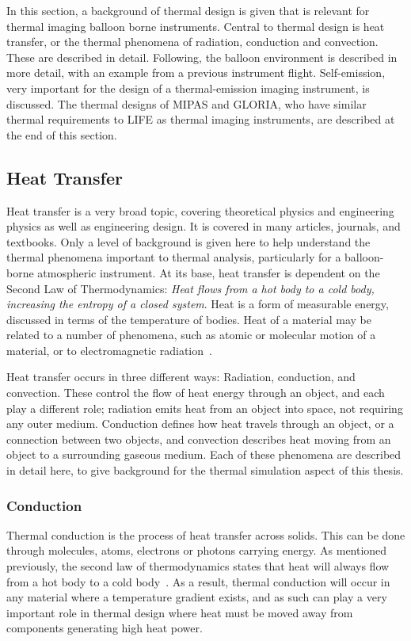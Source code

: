 In this section, a background of thermal design is given that is relevant for thermal imaging balloon borne instruments. Central to thermal design is heat transfer, or the thermal phenomena of radiation, conduction and convection. These are described in detail. Following, the balloon environment is described in more detail, with an example from a previous instrument flight. Self-emission, very important for the design of a thermal-emission imaging instrument, is discussed. The thermal designs of MIPAS and GLORIA, who have similar thermal requirements to LIFE as thermal imaging instruments, are described at the end of this section.

\subsection{Heat Transfer}\label{heat_transfer}
Heat transfer is a very broad topic, covering theoretical physics and engineering physics as well as engineering design. It is covered in many articles, journals, and textbooks. Only a level of background is given here to help understand the thermal phenomena important to thermal analysis, particularly for a balloon-borne atmospheric instrument. At its base, heat transfer is dependent on the Second Law of Thermodynamics: \textit{Heat flows from a hot body to a cold body, increasing the entropy of a closed system}. Heat is a form of measurable energy, discussed in terms of the temperature of bodies. Heat of a material may be related to a number of phenomena, such as atomic or molecular motion of a material, or to electromagnetic radiation~\citep{Heat_Transfer_telescope}.

Heat transfer occurs in three different ways: Radiation, conduction, and convection. These control the flow of heat energy through an object, and each play a different role; radiation emits heat from an object into space, not requiring any outer medium. Conduction defines how heat travels through an object, or a connection between two objects, and convection describes heat moving from an object to a surrounding gaseous medium. Each of these phenomena are described in detail here, to give background for the thermal simulation aspect of this thesis.

\subsubsection{Conduction}
Thermal conduction is the process of heat transfer across solids. This can be done through molecules, atoms, electrons or photons carrying energy. As mentioned previously, the second law of thermodynamics states that heat will always flow from a hot body to a cold body~\citep{Heat_Transfer_Basics}. As a result, thermal conduction will occur in any material where a temperature gradient exists, and as such can play a very important role in thermal design where heat must be moved away from components generating high heat power.

